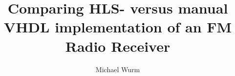 \documentclass[master,english,smartquotes]{hgbthesis}
\title{Comparing HLS- versus manual VHDL implementation of an FM Radio Receiver}
\author{Michael Wurm}
\begin{document}

\frontmatter							%

\maketitle
\tableofcontents




\mainmatter          			%



%
%
%
%
%
%

\appendix                                         %


\MakeBibliography                        				%



\end{document}
